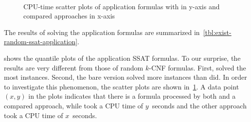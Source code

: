 \begin{figure}[ht]
    \centering
    \\
    \caption{CPU-time scatter plots of application formulas with \erssat in y-axis and compared approaches in x-axis}
    \label{fig:erssat-scatter-application}
\end{figure}

The results of solving the application formulas are summarized in~\cref{tbl:exist-random-ssat-application}.

 shows the quantile plots of the application SSAT formulas.
To our surprise, the results are very different from those of random $k$-CNF formulas.
First, \dcssat solved the most instances.
Second, the bare version \erssatb solved more instances than \erssat did.
In order to investigate this phenomenon,
the scatter plots are shown in~\cref{fig:erssat-scatter-application}.
A data point $(x,y)$ in the plots indicates that there is a formula processed by both \erssat and a compared approach,
while \erssat took a CPU time of $y$~seconds and the other approach took a CPU time of $x$~seconds.